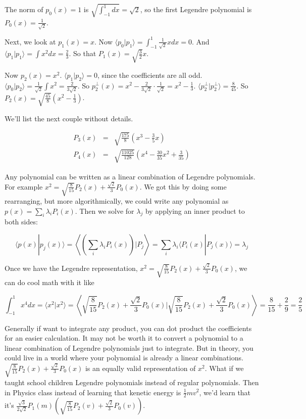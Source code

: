\documentclass{amsbook}
\begin{document}
The norm of $p_0(x)=1$ is $\sqrt{\int_{-1}^1dx}=\sqrt2$, so the first Legendre polynomial is $P_0(x)=\frac{1}{\sqrt2}$.

Next, we look at $p_1(x)=x$.  Now $\langle p_0|p_1\rangle=\int_{-1}^1\frac{1}{\sqrt2}xdx=0$.  And $\langle p_1|p_1\rangle = \int x^2dx=\frac{2}{3}$.  So that $P_1(x)=\sqrt{\frac{3}{2}}x$.

Now $p_2(x)=x^2$.  $\langle p_1|p_2\rangle=0$, since the coefficients are all odd.  $\langle p_0|p_2\rangle=\frac{1}{\sqrt2}\int x^2=\frac{2}{3\sqrt2}$.  So $p_2^\bot(x)=x^2-\frac{2}{3\sqrt2}\cdot\frac{1}{\sqrt2}=x^2-\frac{1}{3}$.  $\langle p_2^\bot|p_2^\bot\rangle=\frac{8}{45}$.  So $P_2(x)=\sqrt{\frac{45}{8}}\left(x^2-\frac{1}{3}\right)$.

We'll list the next couple without details.

$$
\begin{array}{rcl}
P_3(x)&=&\sqrt{\frac{175}{8}}\left(x^3-\frac{3}{5}x\right) \\
P_4(x)&=&\sqrt{\frac{11025}{128}}\left(x^4-\frac{30}{35}x^2+\frac{3}{35}\right)
\end{array}
$$

Any polynomial can be written as a linear combination of Legendre polynomials.  For example $x^2=\sqrt{\frac{8}{15}}P_2(x)+\frac{\sqrt2}{3}P_0(x)$.  We got this by doing some rearranging, but more algorithmically, we could write any polynomial as $p(x)=\sum_i\lambda_iP_i(x)$.  Then we solve for $\lambda_j$ by applying an inner product to both sides:

$$
\langle p(x)|p_j(x)\rangle=\left\langle\left(\sum_i\lambda_iP_i(x)\right)|P_j\right\rangle=\sum_i\lambda_i\langle P_i(x)|P_j(x)\rangle=\lambda_j
$$

Once we have the Legendre representation, $x^2=\sqrt{\frac{8}{15}}P_2(x)+\frac{\sqrt2}{3}P_0(x)$, we can do cool math with it like

$$
\int_{-1}^1x^4dx=\langle x^2|x^2\rangle = \left\langle \sqrt{\frac{8}{15}}P_2(x)+\frac{\sqrt2}{3}P_0(x)|\sqrt{\frac{8}{15}}P_2(x)+\frac{\sqrt2}{3}P_0(x)\right\rangle=\frac{8}{15}+\frac{2}{9}=\frac{2}{5}
$$

Generally if want to integrate any product, you can dot product the coefficients for an easier calculation.  It may not be worth it to convert a polynomial to a linear combination of Legendre polynomials just to integrate.  But in theory, you could live in a world where your polynomial is already a linear combinations.  $\sqrt{\frac{8}{15}}P_2(x)+\frac{\sqrt2}{3}P_0(x)$ is an equally valid representation of $x^2$.  What if we taught school children Legendre polynomials instead of regular polynomials.  Then in Physics class instead of learning that kenetic energy is $\frac{1}{2}mv^2$, we'd learn that it's $\frac{\sqrt{3}}{2\sqrt2}P_1(m)\left(\sqrt{\frac{8}{15}}P_2(v)+\frac{\sqrt2}{3}P_0(v)\right)$.
\end{document}
